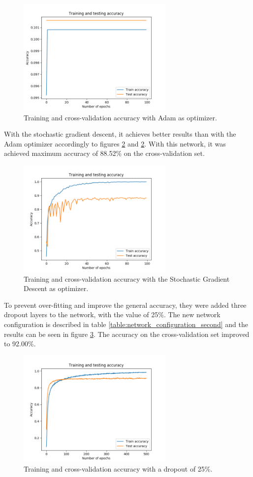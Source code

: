 \documentclass[journal]{IEEEtran}
\begin{document}
\begin{figure}[!t]
\centering
\includegraphics[width=3in]{images/test_1}
\caption{Training and cross-validation accuracy with Adam as optimizer.}
\label{results_1}
\end{figure}

With the stochastic gradient descent, it achieves better results than with the Adam optimizer accordingly to figures \ref{results_2} and \ref{results_2}. With this network, it was achieved maximum accuracy of 88.52\% on the cross-validation set.

\begin{figure}[!t]
\centering
\includegraphics[width=3in]{images/test_2}
\caption{Training and cross-validation accuracy with the Stochastic Gradient Descent as optimizer.}
\label{results_2}
\end{figure}

To prevent over-fitting and improve the general accuracy, they were added three dropout layers to the network, with the value of 25\%. The new network configuration is described in table \ref{table:network_configuration_second} and the results can be seen in figure \ref{results_3}. The accuracy on the cross-validation set improved to 92.00\%.

\begin{figure}[!t]
\centering
\includegraphics[width=3in]{images/test_3}
\caption{Training and cross-validation accuracy with a dropout of 25\%.}
\label{results_3}
\end{figure}
\end{document}

